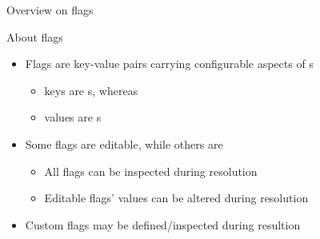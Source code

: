 \documentclass[handout]{beamer}
\begin{document}
\begin{frame}{Overview on flags}
    \begin{block}{About flags}
        \begin{itemize}
            \item Flags are key-value pairs carrying configurable aspects of s
            \begin{itemize}
                \item \alert{keys} are s, whereas
                \item \alert{values} are s
            \end{itemize}
            \item Some flags are editable, while others are 
            \begin{itemize}
                \item All flags can be inspected during resolution
                \item Editable flags' values can be altered during resolution
            \end{itemize}
            \item Custom flags may be defined/inspected during resultion
        \end{itemize}
    \end{block}
\end{frame}
\end{document}
